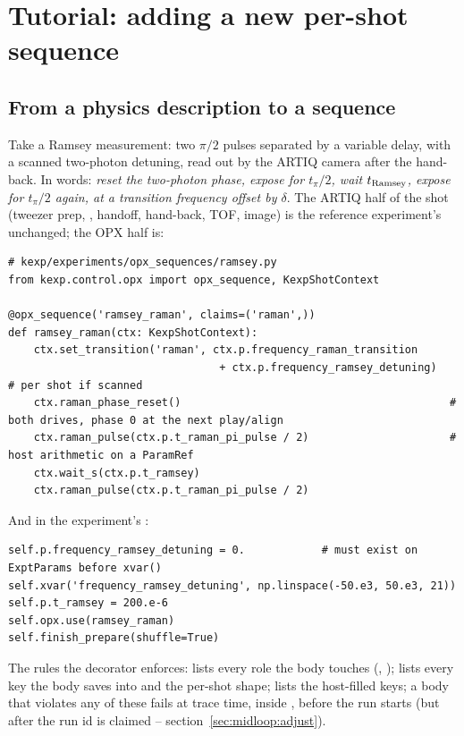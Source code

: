 \section{Tutorial: adding a new per-shot sequence}
\label{sec:tutorial}

\subsection{From a physics description to a sequence}

Take a Ramsey measurement: two $\pi/2$ pulses separated by a variable delay,
with a scanned two-photon detuning, read out by the ARTIQ camera after the
hand-back. In words: \emph{reset the two-photon phase, expose for
$t_\pi/2$, wait $t_{\rm Ramsey}$, expose for $t_\pi/2$ again, at a transition
frequency offset by $\delta$}. The ARTIQ half of the shot (tweezer prep,
, handoff, hand-back, TOF, image) is the reference
experiment's  unchanged; the OPX half is:

\begin{lstlisting}[style=py]
# kexp/experiments/opx_sequences/ramsey.py
from kexp.control.opx import opx_sequence, KexpShotContext

@opx_sequence('ramsey_raman', claims=('raman',))
def ramsey_raman(ctx: KexpShotContext):
    ctx.set_transition('raman', ctx.p.frequency_raman_transition
                                 + ctx.p.frequency_ramsey_detuning)   # per shot if scanned
    ctx.raman_phase_reset()                                          # both drives, phase 0 at the next play/align
    ctx.raman_pulse(ctx.p.t_raman_pi_pulse / 2)                      # host arithmetic on a ParamRef
    ctx.wait_s(ctx.p.t_ramsey)
    ctx.raman_pulse(ctx.p.t_raman_pi_pulse / 2)
\end{lstlisting}

And in the experiment's :

\begin{lstlisting}[style=py]
self.p.frequency_ramsey_detuning = 0.            # must exist on ExptParams before xvar()
self.xvar('frequency_ramsey_detuning', np.linspace(-50.e3, 50.e3, 21))
self.p.t_ramsey = 200.e-6
self.opx.use(ramsey_raman)
self.finish_prepare(shuffle=True)
\end{lstlisting}

The rules the decorator enforces:  lists every role the body
touches (, );  lists every
key the body saves into and the per-shot shape;  lists the
host-filled keys; a body that violates any of these fails at trace time,
inside , before the run starts (but after the run id is
claimed -- section~\ref{sec:midloop:adjust}).


